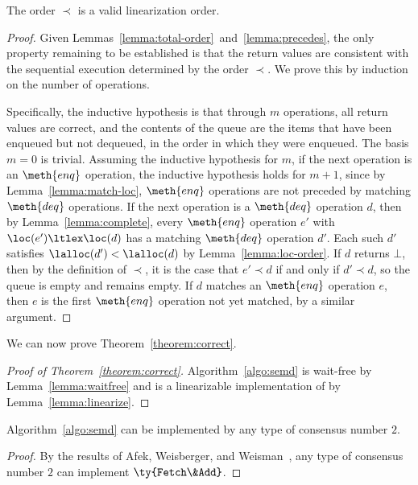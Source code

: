 \begin{lemma}
\label{lemma:linearize}
The order $\prec$ is a valid linearization order. 
\end{lemma}
\begin{proof}
Given Lemmas~\ref{lemma:total-order}~and~\ref{lemma:precedes}, 
the only property remaining to be established 
is that the return values are consistent 
with the sequential execution determined by the order $\prec$. 
We prove this by induction on the number of operations. 

Specifically, 
the inductive hypothesis is that through $m$ operations, 
all return values are correct, 
and the contents of the queue 
are the items that have been enqueued but not dequeued, 
in the order in which they were enqueued. 
The basis $m = 0$ is trivial. 
Assuming the inductive hypothesis for $m$, 
if the next operation is an $\meth{enq}$ operation, 
the inductive hypothesis holds for $m + 1$, 
since by Lemma~\ref{lemma:match-loc}, 
$\meth{enq}$ operations are not preceded 
by matching $\meth{deq}$ operations. 
If the next operation is a $\meth{deq}$ operation $d$, 
then by Lemma~\ref{lemma:complete}, 
every $\meth{enq}$ operation $e'$ with $\loc(e') \ltlex \loc(d)$ 
has a matching $\meth{deq}$ operation $d'$. 
Each such $d'$ satisfies $\lalloc(d') < \lalloc(d)$ 
by Lemma~\ref{lemma:loc-order}. 
If $d$ returns $\bot$, 
then by the definition of $\prec$, 
it is the case that $e' \prec d$ if and only if $d' \prec d$, 
so the queue is empty and remains empty. 
If $d$ matches an $\meth{enq}$ operation $e$, 
then $e$ is the first $\meth{enq}$ operation not yet matched, 
by a similar argument. 
\end{proof}

We can now prove Theorem~\ref{theorem:correct}. 

\begin{proof}[Proof of Theorem~\ref{theorem:correct}]
Algorithm~\ref{algo:semd} is wait-free by Lemma~\ref{lemma:waitfree} 
and is a linearizable implementation of  by Lemma~\ref{lemma:linearize}. 
\end{proof}

\begin{theorem}
Algorithm~\ref{algo:semd} can be implemented by any type of consensus number $2$. 
\end{theorem}
\begin{proof}
By the results of Afek, Weisberger, and Weisman~\cite{DBLP:journals/jal/AfekW99,DBLP:conf/podc/AfekWW92}, any type of consensus number $2$ can implement $\ty{Fetch\&Add}$. 
\end{proof}
